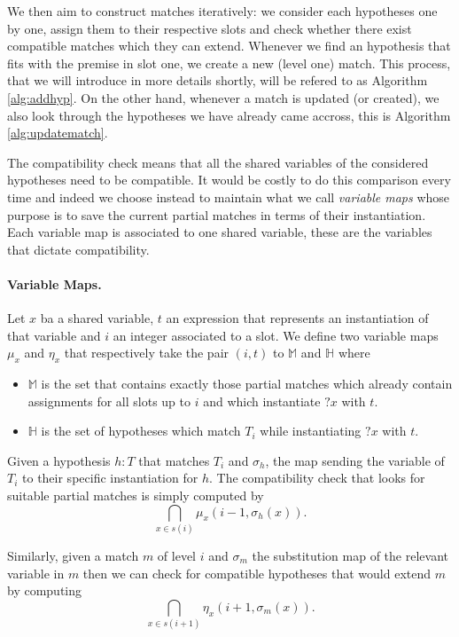 \documentclass[runningheads]{llncs}
\begin{document}
We then aim to construct matches iteratively: we consider each hypotheses one by one, assign them to their respective slots and check whether there exist compatible matches which they can extend.
Whenever we find an hypothesis that fits with the premise in slot one, we create a new (level one) match.
This process, that we will introduce in more details shortly, will be refered to as Algorithm \ref{alg:addhyp}.
On the other hand, whenever a match is updated (or created), we also look through the hypotheses we have already came accross, this is Algorithm \ref{alg:updatematch}.

The compatibility check means that all the shared variables of the considered hypotheses need to be compatible.
It would be costly to do this comparison every time and indeed we choose instead to maintain what we call \textit{variable maps} whose purpose is to save the current partial matches in terms of their instantiation.
Each variable map is associated to one shared variable, these are the variables that dictate compatibility.

\paragraph{Variable Maps.}
Let $x$ ba a shared variable, $t$ an expression that represents an instantiation of that variable and $i$ an integer associated to a slot.
We define two variable maps $\mu_x$ and $\eta_x$ that respectively take the pair $(i,t)$ to $\mathbb{M}$ and $\mathbb{H}$ where
\begin{itemize}
  \item $\mathbb{M}$ is the set that contains exactly those partial matches which already contain assignments for all slots up to $i$ and which instantiate $?x$ with $t$.
  \item $\mathbb{H}$ is the set of hypotheses which match $T_i$ while instantiating $?x$ with $t$.
\end{itemize}

Given a hypothesis $h : T$ that matches $T_i$ and $\sigma_h$, the map sending the variable of $T_i$ to their specific instantiation for $h$.
The compatibility check that looks for suitable partial matches is simply computed by
\[
  \bigcap_{x \in s(i)} \mu_x \left(i - 1, \sigma_h(x)\right).
\]

Similarly, given a match $m$ of level $i$ and $\sigma_m$ the substitution map of the relevant  variable in $m$ then we can check for compatible hypotheses that would extend $m$ by computing
\[
  \bigcap_{x \in s(i + 1)} \eta_x \left(i + 1, \sigma_m(x)\right).
\]
\end{document}
